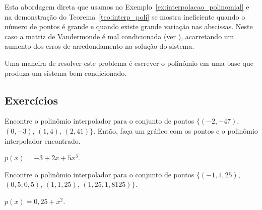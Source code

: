 
Esta abordagem direta que usamos no Exemplo~\ref{ex:interpolacao_polinomial} e na demonstração do Teorema~\ref{teo:interp_poli} se mostra ineficiente quando o número de pontos é grande e quando existe grande variação nas abscissas. Neste caso a matriz de Vandermonde é mal condicionada (ver \cite{Gautschi}), acarretando um aumento dos erros de arredondamento na solução do sistema.

Uma maneira de resolver este problema é escrever o polinômio em uma base que produza um sistema bem condicionado.

\subsection*{Exercícios}

\begin{exer}\label{exer:interp1}
Encontre o polinômio interpolador para o conjunto de pontos $\{(-2, -47)$, $(0, -3)$, $(1, 4)$, $(2, 41)\}$. Então, faça um gráfico com os pontos e o polinômio interpolador encontrado.
\end{exer}
\begin{resp}
  
    $p(x) = -3 + 2x + 5x^3$.
  
\end{resp}

\begin{exer}
  Encontre o polinômio interpolador para o conjunto de pontos $\{(-1, 1,25)$, $(0,5, 0,5)$, $(1, 1,25)$, $(1,25, 1,8125)\}$.
\end{exer}
\begin{resp}
  
    $p(x) = 0,25 + x^2$.
  
\end{resp}

